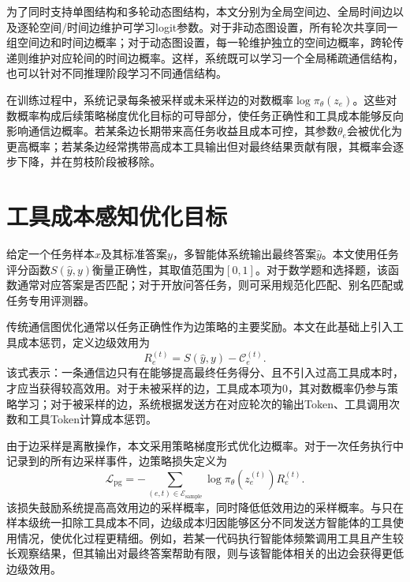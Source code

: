 为了同时支持单图结构和多轮动态图结构，本文分别为全局空间边、全局时间边以及逐轮空间/时间边维护可学习logit参数。对于非动态图设置，所有轮次共享同一组空间边和时间边概率；对于动态图设置，每一轮维护独立的空间边概率，跨轮传递则维护对应轮间的时间边概率。这样，系统既可以学习一个全局稀疏通信结构，也可以针对不同推理阶段学习不同通信结构。

在训练过程中，系统记录每条被采样或未采样边的对数概率$\log \pi_\theta(z_e)$。这些对数概率构成后续策略梯度优化目标的可导部分，使任务正确性和工具成本能够反向影响通信边概率。若某条边长期带来高任务收益且成本可控，其参数$\theta_e$会被优化为更高概率；若某条边经常携带高成本工具输出但对最终结果贡献有限，其概率会逐步下降，并在剪枝阶段被移除。

\section{工具成本感知优化目标}

给定一个任务样本$x$及其标准答案$y$，多智能体系统输出最终答案$\hat{y}$。本文使用任务评分函数$S(\hat{y},y)$衡量正确性，其取值范围为$[0,1]$。对于数学题和选择题，该函数通常对应答案是否匹配；对于开放问答任务，则可采用规范化匹配、别名匹配或任务专用评测器。

传统通信图优化通常以任务正确性作为边策略的主要奖励。本文在此基础上引入工具成本惩罚，定义边级效用为
\begin{equation}
  R_e^{(t)} = S(\hat{y},y)-\mathcal{C}_e^{(t)}.
  \label{eq:edge-reward}
\end{equation}
该式表示：一条通信边只有在能够提高最终任务得分、且不引入过高工具成本时，才应当获得较高效用。对于未被采样的边，工具成本项为0，其对数概率仍参与策略学习；对于被采样的边，系统根据发送方在对应轮次的输出Token、工具调用次数和工具Token计算成本惩罚。

由于边采样是离散操作，本文采用策略梯度形式优化边概率。对于一次任务执行中记录到的所有边采样事件，边策略损失定义为
\begin{equation}
  \mathcal{L}_{\mathrm{pg}}
  = - \sum_{(e,t) \in \mathcal{E}_{\mathrm{sample}}}
  \log \pi_\theta(z_e^{(t)}) R_e^{(t)}.
  \label{eq:policy-gradient-loss}
\end{equation}
该损失鼓励系统提高高效用边的采样概率，同时降低低效用边的采样概率。与只在样本级统一扣除工具成本不同，边级成本归因能够区分不同发送方智能体的工具使用情况，使优化过程更精细。例如，若某一代码执行智能体频繁调用工具且产生较长观察结果，但其输出对最终答案帮助有限，则与该智能体相关的出边会获得更低边级效用。

